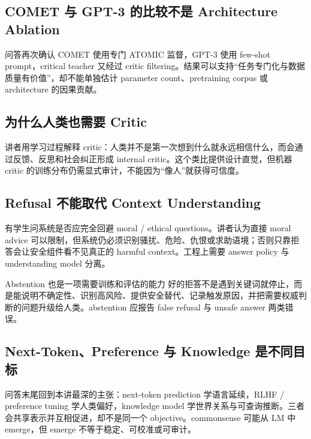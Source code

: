 \subsection{COMET 与 GPT-3 的比较不是 Architecture Ablation}

问答再次确认 COMET 使用专门 ATOMIC 监督，GPT-3 使用 few-shot prompt，critical teacher 又经过 critic filtering。结果可以支持“任务专门化与数据质量有价值”，却不能单独估计 parameter count、pretraining corpus 或 architecture 的因果贡献。

\subsection{为什么人类也需要 Critic}

讲者用学习过程解释 critic：人类并不是第一次想到什么就永远相信什么，而会通过反馈、反思和社会纠正形成 internal critic。这个类比提供设计直觉，但机器 critic 的训练分布仍需显式审计，不能因为“像人”就获得可信度。

\subsection{Refusal 不能取代 Context Understanding}

有学生问系统是否应完全回避 moral / ethical questions。讲者认为直接 moral advice 可以限制，但系统仍必须识别骚扰、危险、仇恨或求助语境；否则只靠拒答会让安全组件看不见真正的 harmful context。工程上需要 answer policy 与 understanding model 分离。

\begin{importantbox}{Abstention 也是一项需要训练和评估的能力}
好的拒答不是遇到关键词就停止，而是能说明不确定性、识别高风险、提供安全替代、记录触发原因，并把需要权威判断的问题升级给人类。abstention 应报告 false refusal 与 unsafe answer 两类错误。
\end{importantbox}

\subsection{Next-Token、Preference 与 Knowledge 是不同目标}

问答末尾回到本讲最深的主张：next-token prediction 学语言延续，RLHF / preference tuning 学人类偏好，knowledge model 学世界关系与可查询推断。三者会共享表示并互相促进，却不是同一个 objective。commonsense 可能从 LM 中 emerge，但 emerge 不等于稳定、可校准或可审计。


